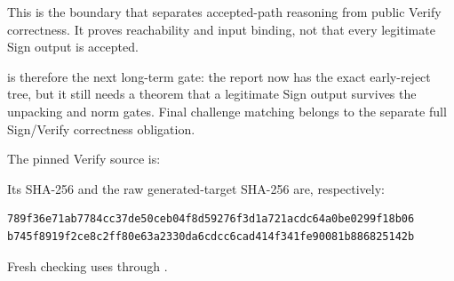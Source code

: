 This is the boundary that separates accepted-path reasoning from public
Verify correctness.  It proves reachability and input binding, not that every
legitimate Sign output is accepted.

 is therefore the next long-term gate:
the report now has the exact early-reject tree, but it still needs a theorem
that a legitimate Sign output survives the unpacking and norm gates.  Final
challenge matching belongs to the separate full
Sign/Verify correctness obligation.

The pinned Verify source is:
\begin{quote}
\end{quote}
Its SHA-256 and the raw generated-target SHA-256 are, respectively:
\begin{verbatim}
789f36e71ab7784cc37de50ceb04f8d59276f3d1a721acdc64a0be0299f18b06
b745f8919f2ce8c2ff80e63a2330da6cdcc6cad414f341fe90081b886825142b
\end{verbatim}
Fresh checking uses  through
.
